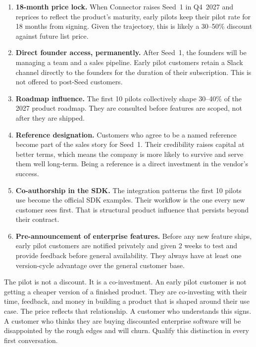 \begin{enumerate}[leftmargin=1.8em, itemsep=4pt]
  \item \textbf{18-month price lock.} When Connector raises Seed~1 in Q4~2027
        and reprices to reflect the product's maturity, early pilots keep
        their pilot rate for 18 months from signing. Given the trajectory,
        this is likely a 30--50\% discount against future list price.

  \item \textbf{Direct founder access, permanently.} After Seed~1, the
        founders will be managing a team and a sales pipeline. Early pilot
        customers retain a Slack channel directly to the founders for the
        duration of their subscription. This is not offered to post-Seed
        customers.

  \item \textbf{Roadmap influence.} The first 10 pilots collectively shape
        30--40\% of the 2027 product roadmap. They are consulted before
        features are scoped, not after they are shipped.

  \item \textbf{Reference designation.} Customers who agree to be a named
        reference become part of the sales story for Seed~1. Their credibility
        raises capital at better terms, which means the company is more
        likely to survive and serve them well long-term. Being a reference
        is a direct investment in the vendor's success.

  \item \textbf{Co-authorship in the SDK.} The integration patterns the
        first 10 pilots use become the official SDK examples. Their workflow
        is the one every new customer sees first. That is structural product
        influence that persists beyond their contract.

  \item \textbf{Pre-announcement of enterprise features.} Before any new
        feature ships, early pilot customers are notified privately and
        given 2 weeks to test and provide feedback before general
        availability. They always have at least one version-cycle advantage
        over the general customer base.
\end{enumerate}

\begin{insightbox}{The pilot is not a discount. It is a co-investment.}
An early pilot customer is not getting a cheaper version of a finished
product. They are co-investing with their time, feedback, and money in
building a product that is shaped around their use case. The price reflects
that relationship. A customer who understands this signs. A customer who
thinks they are buying discounted enterprise software will be disappointed
by the rough edges and will churn. Qualify this distinction in every first
conversation.
\end{insightbox}

